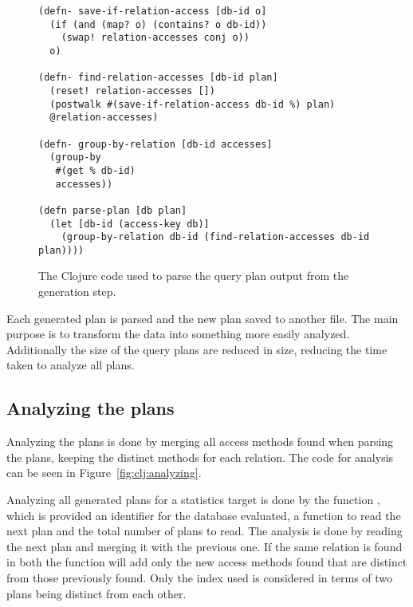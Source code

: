\begin{figure}[ht]
\begin{verbatim}
(defn- save-if-relation-access [db-id o]
  (if (and (map? o) (contains? o db-id))
    (swap! relation-accesses conj o))
  o)

(defn- find-relation-accesses [db-id plan]
  (reset! relation-accesses [])
  (postwalk #(save-if-relation-access db-id %) plan)
  @relation-accesses)

(defn- group-by-relation [db-id accesses]
  (group-by
   #(get % db-id)
   accesses))

(defn parse-plan [db plan]
  (let [db-id (access-key db)]
    (group-by-relation db-id (find-relation-accesses db-id plan))))
   \end{verbatim}
   \caption[The Clojure code to parse a query]{The Clojure code used to parse
     the query plan output from the generation step.}
\label{fig:clj:parsing}
\end{figure}

Each generated plan is parsed and the new plan saved to another file. The main
purpose is to transform the data into something more easily analyzed.
Additionally the size of the query plans are reduced in size, reducing the
time taken to analyze all plans.

\subsection{Analyzing the plans}\label{sec:analyzingplans}
Analyzing the plans is done by merging all access methods found when parsing the
plans, keeping the distinct methods for each relation. The code for analysis can
be seen in Figure~\ref{fig:clj:analyzing}.

Analyzing all generated plans for a statistics target is done by the function
, which is provided an identifier for the database evaluated,
a function to read the next plan and the total number of plans to read. The
analysis is done by reading the next plan and merging it with the previous one.
If the same relation is found in both the function  will add
only the new access methods found that are distinct from those previously found.
Only the index used is considered in terms of two plans being distinct from each
other.

